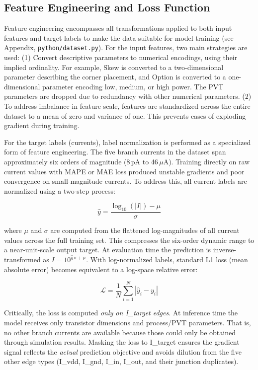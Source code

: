 \documentclass[10pt,twocolumn,letterpaper]{article}
\begin{document}
\subsection{Feature Engineering and Loss Function}
\label{subsec:feature_engineering}

Feature engineering encompasses all transformations applied to both input features and target labels to make the data suitable for model training (see Appendix, \texttt{python/dataset.py}). For the input features, two main strategies are used: (1) Convert descriptive parameters to numerical encodings, using their implied ordinality. For example, Skew is converted to a two-dimensional parameter describing the corner placement, and Option is converted to a one-dimensional parameter encoding low, medium, or high power. The PVT parameters are dropped due to redundancy with other numerical parameters. (2) To address imbalance in feature scale, features are standardized across the entire dataset to a mean of zero and variance of one. This prevents cases of exploding gradient during training.

For the target labels (currents), label normalization is performed as a specialized form of feature engineering. The five branch currents in the dataset span approximately six orders of magnitude (8\,pA to 46\,$\mu$A). Training directly on raw current values with MAPE or MAE loss produced unstable gradients and poor convergence on small-magnitude currents. To address this, all current labels are normalized using a two-step process:

\begin{equation}
  \hat{y} = \frac{\log_{10}(|I|) - \mu}{\sigma}
\end{equation}

where $\mu$ and $\sigma$ are computed from the flattened log-magnitudes of all current values across the full training set. This compresses the six-order dynamic range to a near-unit-scale output target. At evaluation time the prediction is inverse-transformed as $I = 10^{\hat{y}\,\sigma + \mu}$.  With log-normalized labels, standard L1 loss (mean absolute error) becomes equivalent to a log-space relative error:

\begin{equation}
  \mathcal{L} = \frac{1}{N}\sum_{i=1}^{N} \left| \hat{y}_i - y_i \right|
\end{equation}

Critically, the loss is computed \textit{only on I\_target edges}. At inference time the model receives only transistor dimensions and process/PVT parameters.  That is, no other branch currents are available because those could only be obtained through simulation results. Masking the loss to I\_target ensures the gradient signal reflects the \textit{actual} prediction objective and avoids dilution from the five other edge types (I\_vdd, I\_gnd, I\_in, I\_out, and their junction duplicates).
\end{document}

